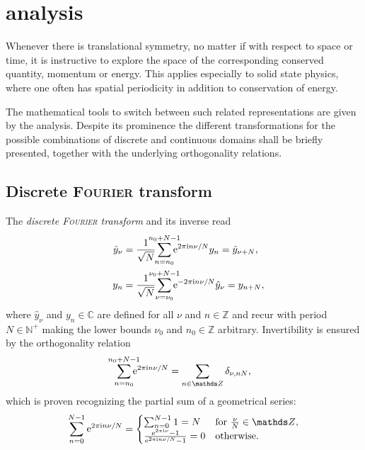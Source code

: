 
\chapter{ analysis}
\label{Fourier analysis}

Whenever there is translational symmetry, no matter if with respect to space or
time, it is instructive to explore the space of the corresponding conserved
quantity, momentum or energy. This applies especially to solid state physics,
where one often has spatial periodicity in addition to conservation of energy.

The mathematical tools to switch between such related representations are given
by the  analysis. Despite its prominence the different
transformations for the possible combinations of discrete and continuous domains
shall be briefly presented, together with the underlying orthogonality
relations.

\section{Discrete \textsc{Fourier} transform}

The \emph{discrete \textsc{Fourier} transform} and its inverse read
%
\begin{align*}
    \hat y_\nu &= \frac 1 {\sqrt N}
    \smashoperator{\sum_{n = n_0}^{n_0 + N - 1}}
    \E^{2 \pi \I n \nu / N} y_n = \hat y_{\nu + N},
    \\
    \quad y_n &= \frac 1 {\sqrt N}
    \smashoperator{\sum_{\nu = \nu_0}^{\nu_0 + N - 1}}
    \E^{-2 \pi \I n \nu / N} \hat y_\nu = y_{n + N},
\end{align*}
%
where $\hat y_\nu$ and $y_n \in \mathds C$ are defined for all $\nu$ and $n \in
\mathds Z$ and recur with period $N \in \mathds N^+$ making the lower bounds
$\nu_0$ and $n_0 \in \mathds Z$ arbitrary. Invertibility is ensured by the
orthogonality relation
%
\begin{equation} \label{DFT orthogonality relation}
    \smashoperator{\sum_{n = n_0}^{n_0 + N - 1}} \E^{2 \pi \I n \nu / N} =
    \sum_{n \in \mathds Z} \delta_{\nu, n N},
\end{equation}
%
which is proven recognizing the partial sum of a geometrical series:
%
\begin{equation*}
    \sum_{n = 0}^{N - 1} \E^{2 \pi \I n \nu / N} =
    \begin{cases}
        \sum_{n = 0}^{N - 1} 1 = N
            & \text{for $\frac \nu N \in \mathds Z$,} \\
        \frac{\E^{2 \pi \I \nu} - 1}{\E^{2 \pi \I n \nu / N} - 1} = 0
            & \text{otherwise.}
    \end{cases}
\end{equation*}

